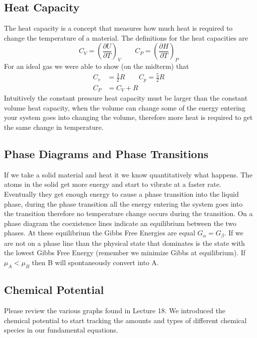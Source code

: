 \documentclass{article}
\begin{document}
\subsection{Heat Capacity}
The heat capacity is a concept that measures how much heat is required to change the temperature of a material. 
The definitions for the heat capacities are 
\begin{equation}
    C_V = \left(\frac{\partial U}{\partial T}\right)_V \qquad   C_P = \left(\frac{\partial H}{\partial T}\right)_P
\end{equation}
For an ideal gas we were able to show (on the midterm) that 
\begin{equation}
\begin{split}
       C_v &= \frac{3}{2}R \qquad C_p = \frac{5}{2}R \\
       C_P &= C_V + R
       \end{split}
\end{equation}
Intuitively the constant pressure heat capacity must be larger than the constant volume heat capacity, when the volume can change some of the energy entering your system goes into changing the volume, therefore more heat is required to get the same change in temperature. 

\subsection{Phase Diagrams and Phase Transitions}
If we take a solid material and heat it we know quantitatively what happens. 
The atoms in the solid get more energy and start to vibrate at a faster rate. 
Eventually they get enough energy to cause a phase transition into the liquid phase, during the phase transition all the energy entering the system goes into the transition therefore no temperature change occurs during the transition. 
On a phase diagram the coexistence lines indicate an equilibrium between the two phases. 
At these equilibrium the Gibbs Free Energies are equal $G_\alpha = G_\beta$. 
If we are not on a phase line than the physical state that dominates is the state with the lowest Gibbs Free Energy (remember we minimize Gibbs at equilibrium). 
If $\mu_A < \mu_B$ then B will spontaneously convert into A. 

\subsection{Chemical Potential}
Please review the various graphs found in Lecture 18. 
We introduced the chemical potential to start tracking the amounts and types of different chemical species in our fundamental equations. 
\end{document}
